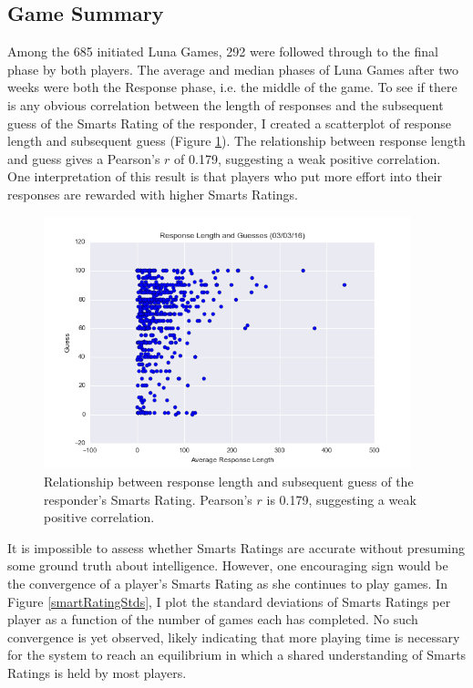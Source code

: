 \subsection{Game Summary}

Among the 685 initiated Luna Games, 292 were followed through to the final phase by both players. The average and median phases of Luna Games after two weeks were both the Response phase, i.e. the middle of the game. To see if there is any obvious correlation between the length of responses and the subsequent guess of the Smarts Rating of the responder, I created a scatterplot of response length and subsequent guess (Figure \ref{responseLengthGuess}). The relationship between response length and guess gives a Pearson's $r$ of 0.179, suggesting a weak positive correlation. One interpretation of this result is that players who put more effort into their responses are rewarded with higher Smarts Ratings.

\begin{figure}
\includegraphics[width=0.95\textwidth]{figures/responseVsGuesses.png}
\caption{\label{responseLengthGuess} Relationship between response length and subsequent guess of the responder's Smarts Rating. Pearson's $r$ is 0.179, suggesting a weak positive correlation.}
\end{figure}

It is impossible to assess whether Smarts Ratings are accurate without presuming some ground truth about intelligence. However, one encouraging sign would be the convergence of a player's Smarts Rating as she continues to play games. In Figure \ref{smartRatingStds}, I plot the standard deviations of Smarts Ratings per player as a function of the number of games each has completed. No such convergence is yet observed, likely indicating that more playing time is necessary for the system to reach an equilibrium in which a shared understanding of Smarts Ratings is held by most players. 

